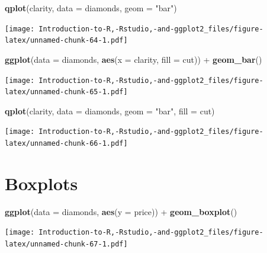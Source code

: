 \documentclass[]{book}
\newenvironment{Shaded}{\begin{snugshade}}{\end{snugshade}}
\newcommand{\KeywordTok}[1]{\textcolor[rgb]{0.13,0.29,0.53}{\textbf{{#1}}}}
\newcommand{\DataTypeTok}[1]{\textcolor[rgb]{0.13,0.29,0.53}{{#1}}}
\newcommand{\StringTok}[1]{\textcolor[rgb]{0.31,0.60,0.02}{{#1}}}
\newcommand{\NormalTok}[1]{{#1}}
\begin{document}
\begin{Shaded}
\begin{Highlighting}[]
\KeywordTok{qplot}\NormalTok{(clarity, }\DataTypeTok{data =} \NormalTok{diamonds, }\DataTypeTok{geom =} \StringTok{"bar"}\NormalTok{)}
\end{Highlighting}
\end{Shaded}

\texttt{[image: Introduction-to-R,-Rstudio,-and-ggplot2\_files/figure-latex/unnamed-chunk-64-1.pdf]}

\begin{Shaded}
\begin{Highlighting}[]
\KeywordTok{ggplot}\NormalTok{(}\DataTypeTok{data =} \NormalTok{diamonds, }\KeywordTok{aes}\NormalTok{(}\DataTypeTok{x =} \NormalTok{clarity, }\DataTypeTok{fill =} \NormalTok{cut)) +}\StringTok{ }\KeywordTok{geom_bar}\NormalTok{() }
\end{Highlighting}
\end{Shaded}

\texttt{[image: Introduction-to-R,-Rstudio,-and-ggplot2\_files/figure-latex/unnamed-chunk-65-1.pdf]}

\begin{Shaded}
\begin{Highlighting}[]
\KeywordTok{qplot}\NormalTok{(clarity, }\DataTypeTok{data =} \NormalTok{diamonds, }\DataTypeTok{geom =} \StringTok{"bar"}\NormalTok{, }\DataTypeTok{fill =} \NormalTok{cut)}
\end{Highlighting}
\end{Shaded}

\texttt{[image: Introduction-to-R,-Rstudio,-and-ggplot2\_files/figure-latex/unnamed-chunk-66-1.pdf]}

\section{Boxplots}\label{boxplots}

\begin{Shaded}
\begin{Highlighting}[]
\KeywordTok{ggplot}\NormalTok{(}\DataTypeTok{data =} \NormalTok{diamonds, }\KeywordTok{aes}\NormalTok{(}\DataTypeTok{y =} \NormalTok{price)) +}\StringTok{ }\KeywordTok{geom_boxplot}\NormalTok{() }
\end{Highlighting}
\end{Shaded}

\texttt{[image: Introduction-to-R,-Rstudio,-and-ggplot2\_files/figure-latex/unnamed-chunk-67-1.pdf]}
\end{document}
